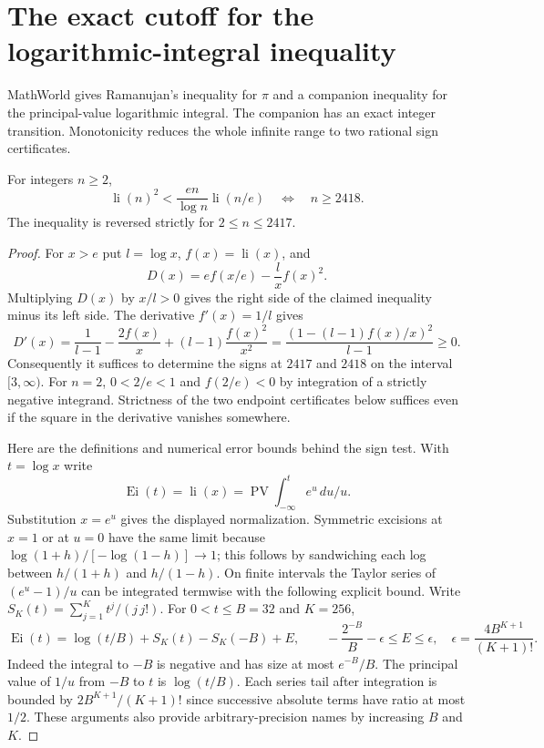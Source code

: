 \section{The exact cutoff for the logarithmic-integral inequality}
\label{sec:li-cut}
MathWorld gives Ramanujan's inequality for $\pi$ and a companion inequality for the principal-value logarithmic integral. The companion has an exact integer transition. Monotonicity reduces the whole infinite range to two rational sign certificates.

\begin{theorem}
For integers $n\ge2$,
\[
 \operatorname{li}(n)^2 <
 \frac{en}{\log n}\operatorname{li}(n/e)
 \quad\Longleftrightarrow\quad n\ge2418 .
\]
The inequality is reversed strictly for $2\le n\le2417$.
\end{theorem}
\begin{proof}
For $x>e$ put $l=\log x$, $f(x)=\operatorname{li}(x)$, and
\[
 D(x)=e f(x/e)-\frac{l}{x} f(x)^2 .
\]
Multiplying $D(x)$ by $x/l>0$ gives the right side of the claimed inequality minus its left side. The derivative $f'(x)=1/l$ gives
\[
 D'(x)=\frac1{l-1}-\frac{2f(x)}x+(l-1)\frac{f(x)^2}{x^2}
       =\frac{(1-(l-1)f(x)/x)^2}{l-1}\ge0.
\]
Consequently it suffices to determine the signs at $2417$ and $2418$ on the interval $[3,\infty)$. For $n=2$, $0<2/e<1$ and $f(2/e)<0$ by integration of a strictly negative integrand. Strictness of the two endpoint certificates below suffices even if the square in the derivative vanishes somewhere.

Here are the definitions and numerical error bounds behind the sign test. With $t=\log x$ write
\[
 \operatorname{Ei}(t)=\operatorname{li}(x)
   =\operatorname{PV}\int_{-\infty}^{t} e^u\,du/u .
\]
Substitution $x=e^u$ gives the displayed normalization. Symmetric excisions at $x=1$ or at $u=0$ have the same limit because $\log(1+h)/[-\log(1-h)]\to1$; this follows by sandwiching each log between $h/(1+h)$ and $h/(1-h)$. On finite intervals the Taylor series of $(e^u-1)/u$ can be integrated termwise with the following explicit bound. Write $S_K(t)=\sum_{j=1}^{K}t^j/(j\,j!)$. For $0<t\le B=32$ and $K=256$,
\[
 \operatorname{Ei}(t)=\log(t/B)+S_K(t)-S_K(-B)+E,\qquad
 -\frac{2^{-B}}{B}-\epsilon\le E\le\epsilon,\quad
 \epsilon=\frac{4B^{K+1}}{(K+1)!}.
\]
Indeed the integral to $-B$ is negative and has size at most $e^{-B}/B$. The principal value of $1/u$ from $-B$ to $t$ is $\log(t/B)$. Each series tail after integration is bounded by $2B^{K+1}/(K+1)!$ since successive absolute terms have ratio at most $1/2$. These arguments also provide arbitrary-precision names by increasing $B$ and $K$.


\end{proof}
